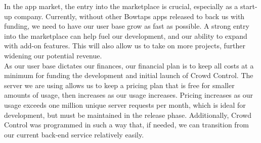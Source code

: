 In the app market, the entry into the marketplace is crucial, especially as a start-up company. Currently, without other Bowtaps apps released to back us with funding, we need to have our user base grow as fast as possible. A strong entry into the marketplace can help fuel our development, and our ability to expand with add-on features. This will also allow us to take on more projects, further widening our potential revenue. \\

As our user base dictates our finances, our financial plan is to keep all costs at a minimum for funding the development and initial launch of Crowd Control. The server we are using allows us to keep a pricing plan that is free for smaller amounts of usage, then increases as our usage increases. Pricing increases as our usage exceeds one million unique server requests per month, which is ideal for development, but must be maintained in the release phase. Additionally, Crowd Control was programmed in such a way that, if needed, we can transition from our current back-end service relatively easily.
